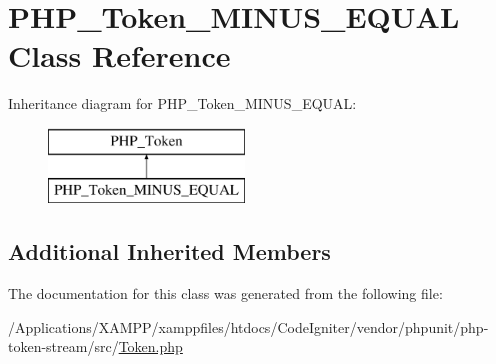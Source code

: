 \hypertarget{class_p_h_p___token___m_i_n_u_s___e_q_u_a_l}{}\section{P\+H\+P\+\_\+\+Token\+\_\+\+M\+I\+N\+U\+S\+\_\+\+E\+Q\+U\+AL Class Reference}
\label{class_p_h_p___token___m_i_n_u_s___e_q_u_a_l}
Inheritance diagram for P\+H\+P\+\_\+\+Token\+\_\+\+M\+I\+N\+U\+S\+\_\+\+E\+Q\+U\+AL\+:\begin{figure}[H]
\begin{center}
\leavevmode
\includegraphics[height=2.000000cm]{class_p_h_p___token___m_i_n_u_s___e_q_u_a_l}
\end{center}
\end{figure}
\subsection*{Additional Inherited Members}


The documentation for this class was generated from the following file\+:\begin{DoxyCompactItemize}
\item 
/\+Applications/\+X\+A\+M\+P\+P/xamppfiles/htdocs/\+Code\+Igniter/vendor/phpunit/php-\/token-\/stream/src/\mbox{\hyperlink{_token_8php}{Token.\+php}}\end{DoxyCompactItemize}
